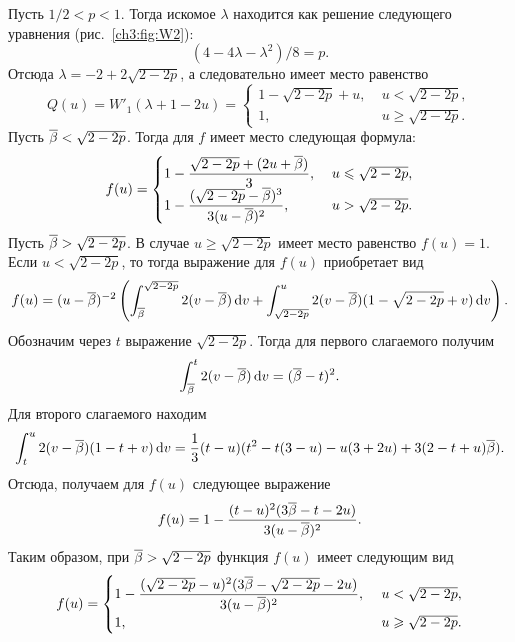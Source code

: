 {\begin{example}
  Пусть $1/2 < p < 1$.
  Тогда искомое $\lambda$ находится как решение следующего уравнения (\seename рис.~\ref{ch3:fig:W2}):
  \[
  (4 - 4\lambda - \lambda^2)/8 = p.
  \]
  Отсюда $\lambda = -2 + 2\sqrt{2 - 2p}$, а следовательно имеет место равенство
  \begin{equation*}
    Q(u) =
    W'_1(\lambda + 1 - 2u) =
    \begin{cases}
      1 - \sqrt{2 - 2p} + u, &\; u < \sqrt{2 - 2p},\\
      1, &\; u \geqslant \sqrt{2 - 2p}.
    \end{cases}
  \end{equation*}
  Пусть ${{\overline{\beta}}} < \sqrt{2 - 2p}$. Тогда для $f$ имеет место следующая формула:
  \begin{equation*}
    f(u) = \begin{cases}
      {\displaystyle 1 - \frac{\sqrt{2 - 2p} + (2u + \ensuremath{{{\overline{\beta}}}})}{3}}, &\; u \leqslant \sqrt{2 - 2p},\\
      {\displaystyle 1 - \frac{(\sqrt{2 - 2p} - {{\overline{\beta}}})^3}{3(u - {{\overline{\beta}}})^2}}, &\; u > \sqrt{2 - 2p}.
    \end{cases}
  \end{equation*}
  Пусть ${{\overline{\beta}}} > \sqrt{2-2p}$.
  В случае $u \geq \sqrt{2 - 2p}$ имеет место равенство $f(u) = 1$.
  Если $u < \sqrt{2 - 2p}$, то тогда выражение для $f(u)$ приобретает вид
  \begin{equation*}
    f(u) = (u-{{\overline{\beta}}})^{-2} \left( 
      \int_{{{\overline{\beta}}}}^{\sqrt{2-2p}} 2(v-{{\overline{\beta}}}) \mathop{}\!\mathrm{d} v +
      \int_{\sqrt{2-2p}}^u 2(v-{{\overline{\beta}}}) (1-\sqrt{2 - 2p} + v) \mathop{}\!\mathrm{d} v
    \right).
  \end{equation*}
  Обозначим через $t$ выражение $\sqrt{2-2p}$.
  Тогда для первого слагаемого получим
  \begin{equation*}
      \int_{{{\overline{\beta}}}}^t 2(v-{{\overline{\beta}}}) \mathop{}\!\mathrm{d} v = ({{\overline{\beta}}} - t)^2.
  \end{equation*}
  Для второго слагаемого находим
  \begin{equation*}
    \int_t^u 2(v - {{\overline{\beta}}}) (1 - t + v) \mathop{}\!\mathrm{d} v = \frac{1}{3} (t - u)(t^2 - t(3-u) - u(3 + 2u) + 3(2-t+u){{\overline{\beta}}}).
  \end{equation*}
  Отсюда, получаем для $f(u)$ следующее выражение
  \begin{equation*}
    f(u) = 1 - \frac{(t-u)^2(3{{\overline{\beta}}} - t - 2u)}{3(u-{{\overline{\beta}}})^2}.
  \end{equation*}
  Таким образом, при ${{\overline{\beta}}} > \sqrt{2-2p}$ функция $f(u)$ имеет следующим вид
  \begin{equation*}
    f(u) = \begin{cases}
      {\displaystyle 1 - \frac{(\sqrt{2-2p}-u)^2(3\ensuremath{{{\overline{\beta}}}}- \sqrt{2-2p} - 2u)}{3(u-\ensuremath{{{\overline{\beta}}}})^2}},\ & u < \sqrt{2-2p}, \\
      1,\ & u \geqslant \sqrt{2-2p}.
    \end{cases}
  \end{equation*}
  

\end{example}}
